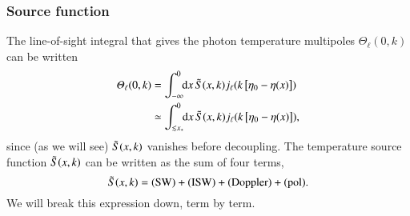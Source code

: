 \subsubsection{Source function}
    The line-of-sight integral that gives the photon temperature multipoles $\Theta_\ell(0,k)$ can be written
    \begin{equation}\label{mil4:theo:eq:los_integration}
    \begin{split}
        \varTheta_\ell (0, k) &= \int_{-\infty}^{0} \!\!\mathop{}\!\mathrm{d} {x}\, \tilde{S}(x,k) j_\ell(k\left[\eta_0 -\eta(x)\right]) \\
        &\simeq  \int_{\lesssim x_*}^{0} \!\!\mathop{}\!\mathrm{d} {x}\, \tilde{S}(x,k) j_\ell(k\left[\eta_0 -\eta(x)\right]),
    \end{split}
    \end{equation}
    since (as we will see) $\tilde{S}(x,k)$ vanishes before decoupling. The temperature source function $\tilde{S}(x,k)$ can be written as the sum of four terms,
    \begin{equation}\label{mil4:theo:eq:source_function_four_terms}
        \tilde{S}(x,k) = \text{(SW)} + \text{(ISW)} + \text{(Doppler)} + \text{(pol)}.
    \end{equation}
    We will break this expression down, term by term. 


